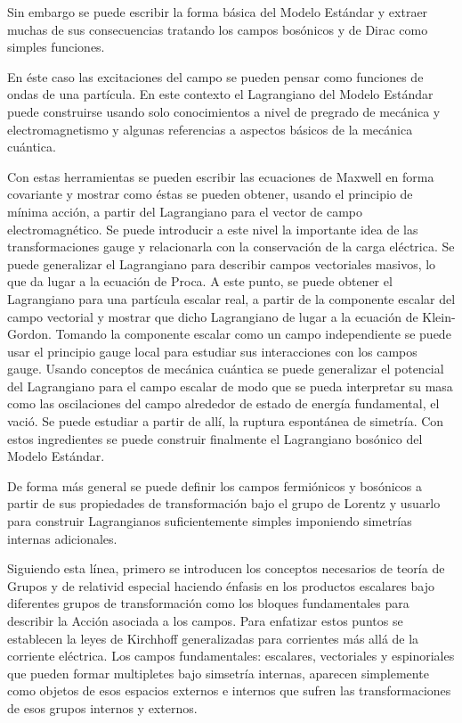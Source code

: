 Sin embargo se puede  escribir la forma básica del Modelo Estándar y extraer muchas de sus consecuencias tratando los campos bosónicos y de Dirac como simples funciones. 

En éste caso las excitaciones del campo se pueden pensar como funciones de ondas de una partícula. En este contexto el Lagrangiano del Modelo Estándar puede construirse usando solo conocimientos a nivel de pregrado de mecánica y electromagnetismo y  algunas referencias a aspectos básicos de la mecánica cuántica. 

Con estas herramientas se pueden escribir las ecuaciones de Maxwell en forma covariante y mostrar como éstas se pueden obtener, usando el principio de mínima acción, a partir del Lagrangiano para el vector de campo electromagnético. Se puede introducir a este nivel la importante idea de las transformaciones gauge y relacionarla con la conservación de la carga eléctrica. Se puede generalizar el Lagrangiano  para describir campos vectoriales masivos, lo que da lugar a la ecuación de Proca. A este punto, se puede obtener el Lagrangiano para una partícula escalar real, a partir de la componente escalar del campo vectorial y mostrar que dicho Lagrangiano de lugar a la ecuación de Klein-Gordon. Tomando la componente escalar como un campo independiente se puede usar el principio gauge local para estudiar sus interacciones con los campos gauge. Usando conceptos de mecánica cuántica se puede generalizar el potencial del Lagrangiano para el campo escalar de modo que se pueda  interpretar su masa como las oscilaciones del campo alrededor de estado de energía fundamental, el vació. Se puede estudiar a partir de allí, la ruptura espontánea de simetría. Con estos ingredientes se puede construir finalmente el Lagrangiano bosónico del Modelo Estándar. 

De forma más general se puede definir los campos fermiónicos y bosónicos a partir de sus propiedades de transformación bajo el grupo de Lorentz y usuarlo para construir Lagrangianos suficientemente simples imponiendo simetrías internas adicionales.


Siguiendo esta línea, primero se introducen los conceptos necesarios de teoría de Grupos y de relativid especial haciendo énfasis en los productos escalares bajo diferentes grupos de transformación como los bloques fundamentales para describir la Acción asociada a los campos. Para enfatizar estos puntos se establecen la leyes de Kirchhoff generalizadas para corrientes más allá de la corriente eléctrica. Los campos fundamentales: escalares, vectoriales y espinoriales que pueden formar multipletes bajo simsetría internas, aparecen simplemente como objetos de esos espacios externos e internos que sufren las transformaciones de esos grupos internos y externos.

